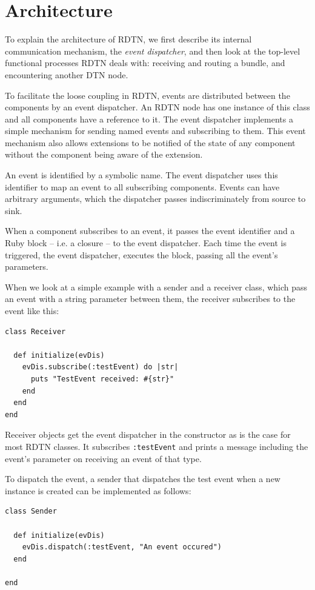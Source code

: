 \documentclass[a4paper]{article}
\begin{document}
\section{Architecture}\label{sec.arch}

To explain the architecture of RDTN, we first describe its internal
communication mechanism, the {\em event dispatcher}, and then look at the
top-level functional processes RDTN deals with: receiving and routing a bundle,
and encountering another DTN node.

To facilitate the loose coupling in RDTN, events are distributed between the
components by an event dispatcher. An RDTN node has one instance of this class
and all components have a reference to it.  The event dispatcher implements a
simple mechanism for sending named events and subscribing to them.  This event
mechanism also allows extensions to be notified of the state of any component
without the component being aware of the extension.

An event is identified by a symbolic name. The event dispatcher uses this
identifier to map an event to all subscribing components. Events can have
arbitrary arguments, which the dispatcher passes indiscriminately from source to
sink.

When a component subscribes to an event, it passes the event identifier and a
Ruby block -- i.e. a closure -- to the event dispatcher. Each time the event is
triggered, the event dispatcher, executes the block, passing all the event's
parameters.  

When we look at a simple example with a sender and a receiver class, which pass
an event with a string parameter between them, the receiver subscribes to the
event like this:

\begin{verbatim}
class Receiver

  def initialize(evDis)
    evDis.subscribe(:testEvent) do |str|
      puts "TestEvent received: #{str}"
    end
  end
end
\end{verbatim}

Receiver objects get the event dispatcher in the constructor as is the case for
most RDTN classes. It subscribes {\tt :testEvent} and prints a message including
the event's parameter on receiving an event of that type.

To dispatch the event, a sender that dispatches the test event when a new
instance is created can be implemented as follows:

\begin{verbatim}
class Sender

  def initialize(evDis)
    evDis.dispatch(:testEvent, "An event occured")
  end

end
\end{verbatim}
\end{document}
